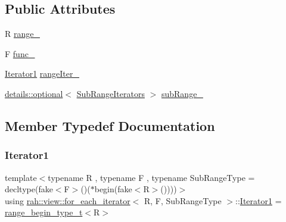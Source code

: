 \subsection*{Public Attributes}
\begin{DoxyCompactItemize}
\item 
R \mbox{\hyperlink{structrah_1_1view_1_1for__each__iterator_a1d2e93d4d471b492e26cd555f623132e}{range\+\_\+}}
\item 
F \mbox{\hyperlink{structrah_1_1view_1_1for__each__iterator_aea40ecb5aabd0237cc792a852f4f946f}{func\+\_\+}}
\item 
\mbox{\hyperlink{structrah_1_1view_1_1for__each__iterator_a173ab775f95bdff3b3756714690be546}{Iterator1}} \mbox{\hyperlink{structrah_1_1view_1_1for__each__iterator_a23d837fe1aca0aa4ef3e3c7683b00aec}{range\+Iter\+\_\+}}
\item 
\mbox{\hyperlink{structrah_1_1view_1_1details_1_1optional}{details\+::optional}}$<$ \mbox{\hyperlink{structrah_1_1view_1_1for__each__iterator_1_1_sub_range_iterators}{Sub\+Range\+Iterators}} $>$ \mbox{\hyperlink{structrah_1_1view_1_1for__each__iterator_a51f880dad745bc5fc0f5de78353ceb90}{sub\+Range\+\_\+}}
\end{DoxyCompactItemize}


\subsection{Member Typedef Documentation}
\mbox{\label{structrah_1_1view_1_1for__each__iterator_a173ab775f95bdff3b3756714690be546}} 
\subsubsection{\texorpdfstring{Iterator1}{Iterator1}}
{\footnotesize\ttfamily template$<$typename R , typename F , typename Sub\+Range\+Type  = decltype(fake$<$\+F$>$()($\ast$begin(fake$<$\+R$>$())))$>$ \\
using \mbox{\hyperlink{structrah_1_1view_1_1for__each__iterator}{rah\+::view\+::for\+\_\+each\+\_\+iterator}}$<$ R, F, Sub\+Range\+Type $>$\+::\mbox{\hyperlink{structrah_1_1view_1_1for__each__iterator_a173ab775f95bdff3b3756714690be546}{Iterator1}} =  \mbox{\hyperlink{namespacerah_a28aff4eeddcece6be65ff0b956d32d4a}{range\+\_\+begin\+\_\+type\+\_\+t}}$<$R$>$}

